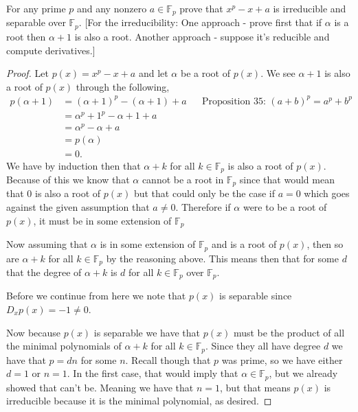 \documentclass[11pt]{article}
\newenvironment{problem}[2][Problem\!]{\begin{trivlist}
\item[\hskip \labelsep {\bfseries #1}\hskip \labelsep {\bfseries #2}]}{\end{trivlist}}
\newcommand{\ff}{\mathbb F}   %
\begin{document}
\vspace*{20pt}
\begin{tcolorbox}
    \begin{problem}{13.5.5}
        For any prime $p$ and any nonzero $a \in \mathbb{F}_p$ prove that $x^{p} -x +a$ is irreducible and separable over $\mathbb{F}_p$. [For the irreducibility: One approach - prove first that if $\alpha$ is a root then $\alpha + 1$ is also a root. Another approach - suppose it's reducible and compute derivatives.]
    \end{problem}
\end{tcolorbox}
\begin{proof}
    Let $p(x) = x^{p} -x + a$ and let $\alpha$ be a root of $p(x)$. We see $\alpha + 1$ is also a root of $p(x)$ through the following,
    \begin{align*}
        p(\alpha + 1) &= (\alpha + 1)^{p} - (\alpha + 1 ) + a && \text{Proposition 35: } (a+b)^{p} = a^{p} + b^{p}\\
        &= \alpha^{p} + 1^{p} - \alpha + 1 + a \\
        &= \alpha^{p} - \alpha + a  \\
        &= p(\alpha)\\
        &= 0.
    \end{align*}
    We have by induction then that $\alpha + k$ for all $k \in \ff_p$ is also a root of $p(x)$. Because of this we know that $\alpha$ cannot be a root in $\ff_p$ since that would mean that $0$ is also a root of $p(x)$ but that could only be the case if $a = 0$ which goes against the given assumption that $a \neq 0$. Therefore if $\alpha$ were to be a root of $p(x)$, it must be in some extension of $\ff_p$

    Now assuming that $\alpha$ is in some extension of $\ff_p$ and is a root of $p(x)$, then so are $\alpha + k$ for all $k \in \ff_p$ by the reasoning above. This means then that for some $d$ that the degree of $\alpha + k$ is $ d$ for all $k \in \ff_p$ over $\ff_p$. 

    Before we continue from here we note that $p(x)$ is separable since $D_xp(x) = -1 \neq 0$. 

    Now because $p(x)$ is separable we have that $p(x)$ must be the product of all the minimal polynomials of $\alpha + k$ for all $k \in \ff_p$. Since they all have degree $d$ we have that $p = dn$ for some $n$. Recall though that $p$ was prime, so we have either $d = 1$ or $n = 1$. In the first case, that would imply that  $\alpha \in \ff_p$, but we already showed that can't be. Meaning we have that $n = 1$, but that means $p(x)$ is irreducible because it is the minimal polynomial, as desired. 
\end{proof}
\end{document}
